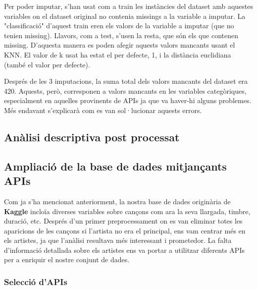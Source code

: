 Per poder imputar, s'han usat com a train les instàncies del dataset amb aquestes variables on el dataset original no contenia missings a la variable a imputar. La "classificació" d'aquest train eren els valors de la variable a imputar (que no tenien missing). Llavors, com a test, s'usen la resta, que són els que contenen missing. D'aquesta manera es poden afegir aquests valors mancants usant el KNN. El valor de k usat ha estat el per defecte, 1, i la distància euclidiana (també el valor per defecte).

Després de les 3 imputacions, la suma total dels valors mancants del dataset era 420. Aquests, però, corresponen a valors mancants en les variables categòriques, especialment en aquelles provinents de APIs ja que va haver-hi alguns problemes. Més endavant s'explicarà com es van sol·lucionar aquests errors.


\subsection{Anàlisi descriptiva post processat}


\subsection{Ampliació de la base de dades mitjançants APIs}

Com ja s'ha mencionat anteriorment, la nostra base de dades originària de \textbf{Kaggle} incloïa diverses variables sobre cançons com ara la seva llargada, timbre, duració, etc. Després d'un primer preprocessament on es van eliminar totes les aparicions de les cançons si l'artista no era el principal, ens vam centrar més en els artistes, ja que l'anàlisi resultava més interessant i prometedor. La falta d'informació detallada sobre els artistes ens va portar a utilitzar diferents APIs per a enriquir el nostre conjunt de dades.

\subsubsection{Selecció d'APIs}

